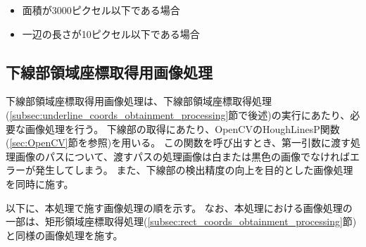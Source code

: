 \begin{itemize}
    \item 面積が3000ピクセル以下である場合
    \item 一辺の長さが10ピクセル以下である場合
\end{itemize}






\subsection{下線部領域座標取得用画像処理}\label{subsec:image_processing_for_underline_coords_obtainment}
下線部領域座標取得用画像処理は、下線部領域座標取得処理(\ref{subsec:underline_coords_obtainment_processing}節で後述)の実行にあたり、必要な画像処理を行う。
下線部の取得にあたり、OpenCVのHoughLinesP関数(\ref{sec:OpenCV}節を参照)を用いる。
この関数を呼び出すとき、第一引数に渡す処理画像のパスについて、渡すパスの処理画像は白または黒色の画像でなければエラーが発生してしまう。
また、下線部の検出精度の向上を目的とした画像処理を同時に施す。

以下に、本処理で施す画像処理の順を示す。
なお、本処理における画像処理の一部は、矩形領域座標取得処理(\ref{subsec:rect_coords_obtainment_processing}節)と同様の画像処理を施す。

